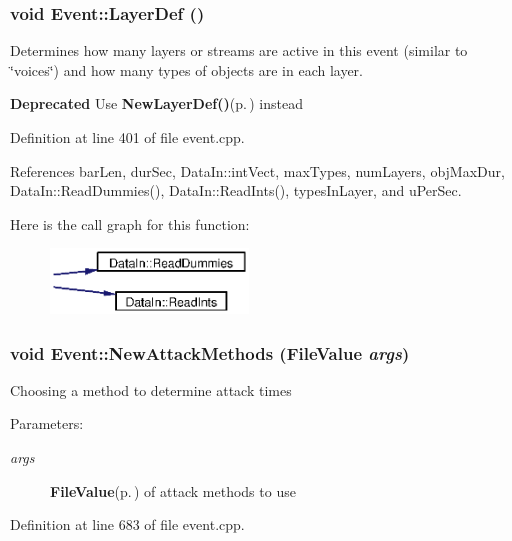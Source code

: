 \subsubsection{\setlength{\rightskip}{0pt plus 5cm}void Event::Layer\-Def ()}\label{classEvent_a24}


Determines how many layers or streams are active in this event (similar to \char`\"{}voices\char`\"{}) and how many types of objects are in each layer. 

\begin{Desc}
\item[{\bf Deprecated}]Use {\bf New\-Layer\-Def()}{\rm (p.\,\pageref{classEvent_a25})} instead \end{Desc}


Definition at line 401 of file event.cpp.

References bar\-Len, dur\-Sec, Data\-In::int\-Vect, max\-Types, num\-Layers, obj\-Max\-Dur, Data\-In::Read\-Dummies(), Data\-In::Read\-Ints(), types\-In\-Layer, and u\-Per\-Sec.

Here is the call graph for this function:\begin{figure}[H]
\begin{center}
\leavevmode
\includegraphics[width=149pt]{classEvent_a24_cgraph}
\end{center}
\end{figure}
\subsubsection{\setlength{\rightskip}{0pt plus 5cm}void Event::New\-Attack\-Methods ({\bf File\-Value} {\em args})}\label{classEvent_a34}


Choosing a method to determine attack times \begin{Desc}
\item[Parameters:]
\begin{description}
\item[{\em args}]{\bf File\-Value}{\rm (p.\,\pageref{classFileValue})} of attack methods to use \end{description}
\end{Desc}


Definition at line 683 of file event.cpp.


